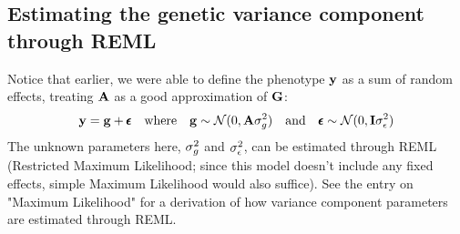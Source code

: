 \documentclass[12pt]{article}
\begin{document}
\subsection{Estimating the genetic variance component through REML}
Notice that earlier, we were able to define the phenotype $\mathbf{y}$ as a sum of random effects, treating $\mathbf{A}$ as a good approximation of $\mathbf{G}$:
\begin{equation*}
\mathbf{y} = \mathbf{g} + \pmb{\epsilon}
\quad\mathrm{where}\quad
\mathbf{g} \sim \mathcal{N}(0, \mathbf{A} \sigma_g^2)
\quad\mathrm{and}\quad
\pmb{\epsilon} \sim \mathcal{N}(0, \mathbf{I} \sigma_{\epsilon}^2)
\end{equation*}
The unknown parameters here, $\sigma_g^2$ and $\sigma_{\epsilon}^2$, can be estimated through REML (Restricted Maximum Likelihood; since this model doesn't include any fixed effects, simple Maximum Likelihood would also suffice). See the entry on "Maximum Likelihood" for a derivation of how variance component parameters are estimated through REML.
\end{document}
